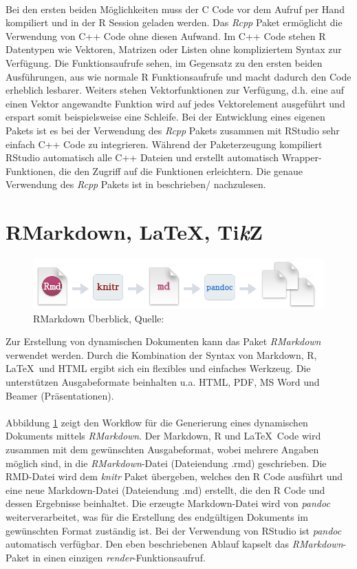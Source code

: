\\
Bei den ersten beiden Möglichkeiten muss der C Code vor dem Aufruf per Hand kompiliert und in der R Session geladen werden. Das \emph{Rcpp} Paket ermöglicht die Verwendung von C++ Code ohne diesen Aufwand. Im C++ Code stehen R Datentypen wie Vektoren, Matrizen oder Listen ohne kompliziertem Syntax zur Verfügung. Die Funktionsaufrufe sehen, im Gegensatz zu den ersten beiden Ausführungen, aus wie normale R Funktionsaufrufe und macht dadurch den Code erheblich lesbarer. Weiters stehen Vektorfunktionen zur Verfügung, d.h. eine auf einen Vektor angewandte Funktion wird auf jedes Vektorelement ausgeführt und erspart somit beispielsweise eine Schleife. Bei der Entwicklung eines eigenen Pakets ist es bei der Verwendung des \emph{Rcpp} Pakets zusammen mit RStudio sehr einfach C++ Code zu integrieren. Während der Paketerzeugung kompiliert RStudio automatisch alle C++ Dateien und erstellt automatisch Wrapper-Funktionen, die den Zugriff auf die Funktionen erleichtern. Die genaue Verwendung des \emph{Rcpp} Pakets ist in \cite{wickham2015advanced} beschrieben/ nachzulesen.
\section{RMarkdown, \LaTeX, Ti\textit{k}Z}
\label{kapitel:rmarkdown}
\begin{figure}[!t]
\centering
\includegraphics[width=\textwidth]{abbildungen/rmarkdown}
\caption{RMarkdown Überblick, Quelle: \cite{rmarkdown}}
\label{abb:rmarkdown}
\end{figure}
Zur Erstellung von dynamischen Dokumenten kann das Paket \emph{RMarkdown} verwendet werden. Durch die Kombination der Syntax von Markdown, R, \LaTeX\ und HTML ergibt sich ein flexibles und einfaches Werkzeug. Die unterstützen Ausgabeformate beinhalten u.a. HTML, PDF, MS Word und Beamer (Präsentationen).
\\
\\
Abbildung \ref{abb:rmarkdown} zeigt den Workflow für die Generierung eines dynamischen Dokuments mittels \emph{RMarkdown}. Der Markdown, R und \LaTeX\ Code wird zusammen mit dem gewünschten Ausgabeformat, wobei mehrere Angaben möglich sind, in die \emph{RMarkdown}-Datei (Dateiendung .rmd) geschrieben. Die RMD-Datei wird dem \emph{knitr} Paket übergeben, welches den R Code ausführt und eine neue Markdown-Datei (Dateiendung .md) erstellt, die den R Code und dessen Ergebnisse beinhaltet. Die erzeugte Markdown-Datei wird von \emph{pandoc} weiterverarbeitet, was für die Erstellung des endgültigen Dokuments im gewünschten Format zuständig ist. Bei der Verwendung von RStudio ist \emph{pandoc} automatisch verfügbar. Den eben beschriebenen Ablauf kapselt das \emph{RMarkdown}-Paket in einen einzigen \emph{render}-Funktionsaufruf.
\\
\\
